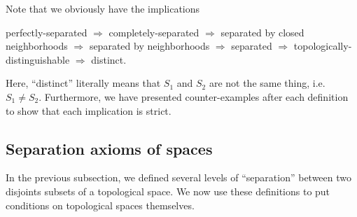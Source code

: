 Note that we obviously have the implications
\begin{textequation}
perfectly-separated $\Rightarrow$ completely-separated $\Rightarrow $ separated by closed neighborhoods $\Rightarrow $ separated by neighborhoods $\Rightarrow$ separated $\Rightarrow$ topologically-distinguishable $\Rightarrow$ distinct.
\end{textequation}
Here, ``distinct'' literally means that $S_1$ and $S_2$ are not the same thing, i.e. $S_1\neq S_2$.  Furthermore, we have presented counter-examples after each definition to show that each implication is strict.

\subsection{Separation axioms of spaces}

In the previous subsection, we defined several levels of ``separation'' between two disjoints subsets of a topological space.  We now use these definitions to put conditions on topological spaces themselves.

